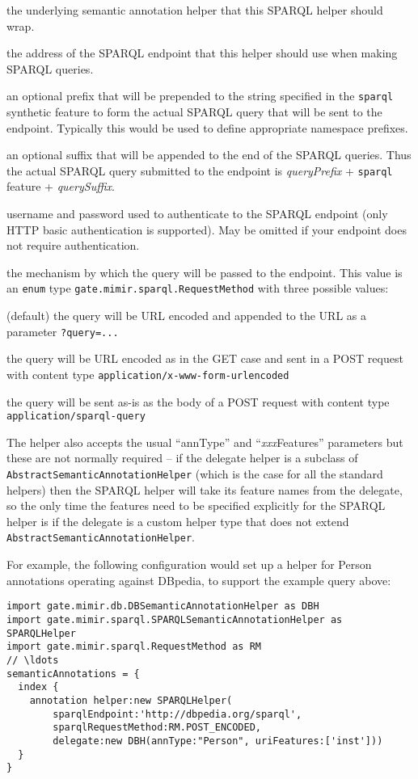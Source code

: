 \bde
\item[delegate (required)] the underlying semantic annotation helper that this
  SPARQL helper should wrap.
\item[sparqlEndpoint (required)] the address of the SPARQL endpoint that this
  helper should use when making SPARQL queries.
\item[queryPrefix] an optional prefix that will be prepended to the string
  specified in the {\tt sparql} synthetic feature to form the actual SPARQL
  query that will be sent to the endpoint.  Typically this would be used to
  define appropriate namespace prefixes.
\item[querySuffix] an optional suffix that will be appended to the end of the
  SPARQL queries.  Thus the actual SPARQL query submitted to the endpoint is
  {\em queryPrefix} + {\tt sparql} feature + {\em querySuffix}.
\item[sparqlEndpointUser and sparqlEndpointPassword] username and password used
  to authenticate to the SPARQL endpoint (only HTTP basic authentication is
  supported).  May be omitted if your endpoint does not require authentication.
\item[sparqlRequestMethod] the mechanism by which the query will be passed to
  the endpoint.  This value is an {\tt enum} type
  {\tt gate.mimir.sparql.RequestMethod} with three possible values:
  \bde
  \item[GET] (default) the query will be URL encoded and appended to the URL as
    a parameter \verb!?query=...!
  \item[POST\textunderscore{}ENCODED] the query will be URL encoded as in the GET case and sent
    in a POST request with content type {\tt application/x-www-form-urlencoded}
  \item[POST\textunderscore{}PLAIN] the query will be sent as-is as the body of a POST request
    with content type {\tt application/sparql-query}
  \ede
\ede

The helper also accepts the usual ``annType'' and ``{\em xxx}Features''
parameters but these are not normally required -- if the delegate helper is a
subclass of {\tt AbstractSemanticAnnotationHelper} (which is the case for all
the standard helpers) then the SPARQL helper will take its feature names from
the delegate, so the only time the features need to be specified explicitly for
the SPARQL helper is if the delegate is a custom helper type that does not
extend {\tt AbstractSemanticAnnotationHelper}.

For example, the following configuration would set up a helper for Person
annotations operating against DBpedia, to support the example query above:
\begin{lstlisting}[texcl, breaklines, breakindent=150pt]
import gate.mimir.db.DBSemanticAnnotationHelper as DBH
import gate.mimir.sparql.SPARQLSemanticAnnotationHelper as SPARQLHelper
import gate.mimir.sparql.RequestMethod as RM
// \ldots
semanticAnnotations = {
  index {
    annotation helper:new SPARQLHelper(
        sparqlEndpoint:'http://dbpedia.org/sparql',
        sparqlRequestMethod:RM.POST_ENCODED,
        delegate:new DBH(annType:"Person", uriFeatures:['inst']))
  }
}
\end{lstlisting}

